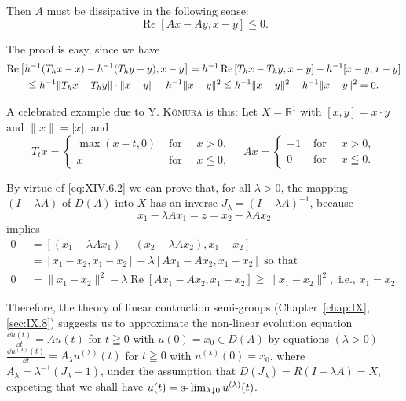 Then $A$ must be dissipative in the following sense: 
\begin{equation}\label{eq:XIV.6.2}
\operatorname{Re} [ A x - A y, x - y ] \leqq 0.
\end{equation}

The proof is easy, since we have 
\begin{gather}\operatorname{Re} \left[ h ^{-1} (T _{h} x - x) - h ^{-1} (T _{h} y - y), x - y \right] = {} h ^{-1} \operatorname{Re} \left[ T _{h} x - T _{h} y, x - y \right] - h ^{-1} [ x - y, x - y ] \notag \\\leqq {} h ^{-1} \| T _{h} x - T _{h} y \| \cdot \| x - y \| - h ^{-1} \| x - y \| ^{2} \leqq {} h ^{-1} \| x - y \| ^{2} - h ^{-1} \| x - y \| ^{2} = 0. \notag
\end{gather}

A celebrated example due to Y. \textsc{Kōmura} \cite{komura158} is this: Let $X = \mathbb{R}^{1}$ with $[x, y] = x \cdot y$ and $\|x\| = |x|$, and 
\[
T _{t} x = \begin{cases}\max (x - t, 0) & \text{ for } \quad x > 0, \\ x & \text{ for } \quad x \leqq 0,\end{cases} \quad A x = \begin{cases}- 1 & \text{ for } \quad x > 0, \\ 0 & \text{ for } \quad x \leqq 0.\end{cases}
\]

By virtue of \eqref{eq:XIV.6.2} we can prove that, for all $\lambda > 0$, the mapping $(I - \lambda A)$ of $D(A)$ into $X$ has an inverse $J_{\lambda} = (I - \lambda A)^{-1}$, because 
\[
x _{1} - \lambda A x _{1} = z = x _{2} - \lambda A x _{2}
\]
implies 
\[
\begin{aligned}
0 &= [ (x _{1} - \lambda A x _{1}) - (x _{2} - \lambda A x _{2}), x _{1} - x _{2} ]
\\
\quad &= [ x _{1} - x _{2}, x _{1} - x _{2} ] - \lambda [ A x _{1} - A x _{2}, x _{1} - x _{2} ] \text{ so that }
\\
0 &= \| x _{1} - x _{2} \| ^{2} - \lambda \operatorname{Re} [ A x _{1} - A x _{2}, x _{1} - x _{2} ] \geqq \| x _{1} - x _{2} \| ^{2}, \text{ i.e., } x _{1} = x _{2}.
\end{aligned}
\]

Therefore, the theory of linear contraction semi-groups (Chapter~\ref{chap:IX}, \ref{sec:IX.8}) suggests us to approximate the non-linear evolution equation 
$\frac{\dd u(t)}{\dd t} = A u(t)$ for $t \geqq 0$ with $u(0) = x_0 \in D(A)$ by equations $(\lambda > 0)$ $\frac{\dd u^{(\lambda)}(t)}{\dd t} = A_{\lambda} u^{(\lambda)}(t)$ for $t \geqq 0$ with $u^{(\lambda)}(0) = x_0$, where $A_{\lambda} = \lambda^{-1}(J_{\lambda} - 1)$, under the assumption that $D(J_{\lambda}) = R(I - \lambda A) = X$, expecting that we shall have $u(t) = \text{s-}\lim\nolimits_{\lambda \downarrow 0} u^{(\lambda)}(t)$. 

